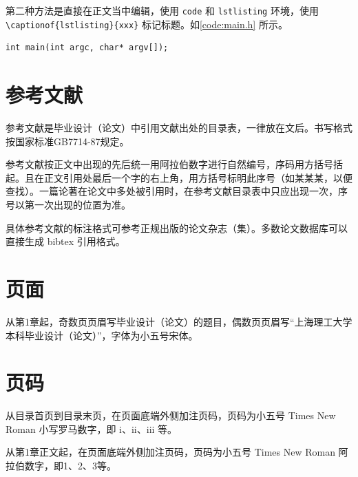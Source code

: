 \par 第二种方法是直接在正文当中编辑，使用 \lstinline|code| 和 \lstinline|lstlisting| 环境，使用 \lstinline|\captionof{lstlisting}{xxx}| 标记标题。如\autoref{code:main.h} 所示。
\begin{code}
\label{code:main.h}
\begin{lstlisting}
int main(int argc, char* argv[]);
\end{lstlisting}
\end{code}

\section{参考文献}

\par 参考文献是毕业设计（论文）中引用文献出处的目录表，一律放在文后。书写格式按国家标准GB7714-87规定。
\par 参考文献按正文中出现的先后统一用阿拉伯数字进行自然编号，序码用方括号括起。且在正文引用处最后一个字的右上角，用方括号标明此序号（如某某某\cite{论文}，以便查找）。一篇论著在论文中多处被引用时，在参考文献目录表中只应出现一次，序号以第一次出现的位置为准。
\par 具体参考文献的标注格式可参考正规出版的论文杂志（集）。多数论文数据库可以直接生成 bibtex 引用格式。

\section{页面}
\par 从第1章起，奇数页页眉写毕业设计（论文）的题目，偶数页页眉写“上海理工大学本科毕业设计（论文）”，字体为小五号宋体。

\section{页码}
\par 从目录首页到目录末页，在页面底端外侧加注页码，页码为小五号 Times New Roman 小写罗马数字，即 i、ii、iii 等。
\par 从第1章正文起，在页面底端外侧加注页码，页码为小五号 Times New Roman 阿拉伯数字，即1、2、3等。

